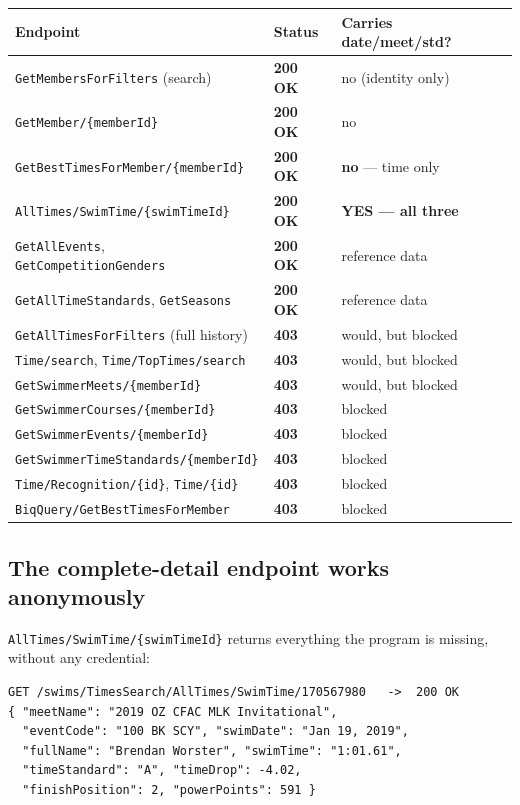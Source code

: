 \documentclass[12pt]{article}
\newcommand{\code}[1]{\texttt{#1}}
\newcommand{\yes}{\textcolor{okgreen}{\textbf{200 OK}}}
\newcommand{\no}{\textcolor{badred}{\textbf{403}}}
\begin{document}
\begin{center}
\begin{longtable}{@{}p{6.9cm} l p{4.6cm}@{}}
  \toprule
  \textbf{Endpoint} & \textbf{Status} & \textbf{Carries date/meet/std?} \\
  \midrule\endhead
  \code{GetMembersForFilters} (search)      & \yes & no (identity only) \\
  \code{GetMember/\{memberId\}}             & \yes & no \\
  \code{GetBestTimesForMember/\{memberId\}} & \yes & \textbf{no} --- time only \\
  \code{AllTimes/SwimTime/\{swimTimeId\}}   & \yes & \textbf{YES --- all three} \\
  \code{GetAllEvents}, \code{GetCompetitionGenders} & \yes & reference data \\
  \code{GetAllTimeStandards}, \code{GetSeasons}     & \yes & reference data \\
  \midrule
  \code{GetAllTimesForFilters} (full history) & \no & would, but blocked \\
  \code{Time/search}, \code{Time/TopTimes/search} & \no & would, but blocked \\
  \code{GetSwimmerMeets/\{memberId\}}       & \no & would, but blocked \\
  \code{GetSwimmerCourses/\{memberId\}}     & \no & blocked \\
  \code{GetSwimmerEvents/\{memberId\}}      & \no & blocked \\
  \code{GetSwimmerTimeStandards/\{memberId\}} & \no & blocked \\
  \code{Time/Recognition/\{id\}}, \code{Time/\{id\}} & \no & blocked \\
  \code{BiqQuery/GetBestTimesForMember}     & \no & blocked \\
  \bottomrule
\end{longtable}
\end{center}

\subsection{The complete-detail endpoint works anonymously}

\code{AllTimes/SwimTime/\{swimTimeId\}} returns everything the program is
missing, without any credential:

\begin{lstlisting}
GET /swims/TimesSearch/AllTimes/SwimTime/170567980   ->  200 OK
{ "meetName": "2019 OZ CFAC MLK Invitational",
  "eventCode": "100 BK SCY", "swimDate": "Jan 19, 2019",
  "fullName": "Brendan Worster", "swimTime": "1:01.61",
  "timeStandard": "A", "timeDrop": -4.02,
  "finishPosition": 2, "powerPoints": 591 }
\end{lstlisting}
\end{document}

